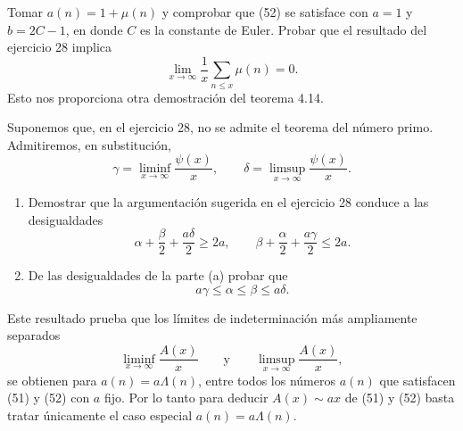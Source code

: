 \documentclass[12pt,a4paper]{book}
\begin{document}
    \begin{ejercicio}
        Tomar $a(n)=1+\mu(n)$ y comprobar que (52) se satisface con $a=1$ y
        $b=2C-1$, en donde $C$ es la constante de Euler. Probar que el resultado del
        ejercicio 28 implica
        \begin{equation*}
            \lim_{x\to\infty}\frac{1}{x}\sum_{n\leq x}\mu(n)=0.
        \end{equation*}
        Esto nos proporciona otra demostración del teorema 4.14.
    \end{ejercicio}

    \begin{ejercicio}
        Suponemos que, en el ejercicio 28, no se admite el teorema del número primo.
        Admitiremos, en substitución,
        \begin{equation*}
            \gamma=\liminf_{x\to\infty}\frac{\psi(x)}{x},\qquad\delta=\limsup_{x\to\infty}\frac{\psi(x)}{x}.
        \end{equation*}
        \begin{enumerate}
            \item[(a)] Demostrar que la argumentación sugerida en el ejercicio 28
            conduce a las desigualdades
            \begin{equation*}
                \alpha+\frac{\beta}{2}+\frac{a\delta}{2}\geq2a,\qquad
                \beta+\frac{\alpha}{2}+\frac{a\gamma}{2}\leq2a.
            \end{equation*}
            \item[(b)] De las desigualdades de la parte (a) probar que
            \begin{equation*}
                a\gamma\leq\alpha\leq\beta\leq a\delta.
            \end{equation*}
        \end{enumerate}
        Este resultado prueba que los límites de indeterminación más ampliamente
        separados
        \begin{equation*}
            \liminf_{x\to\infty}\frac{A(x)}{x}\qquad\text{y}\qquad\limsup_{x\to\infty}\frac{A(x)}{x},
        \end{equation*}
        se obtienen para $a(n)=a\Lambda(n)$, entre todos los números $a(n)$ que
        satisfacen (51) y (52) con $a$ fijo. Por lo tanto para deducir $A(x)\sim ax$
        de (51) y (52) basta tratar únicamente el caso especial $a(n)=a\Lambda(n)$.
    \end{ejercicio}
\end{document}
